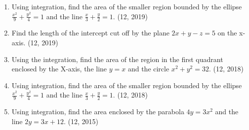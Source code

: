 \begin{enumerate}[label=\thesubsection.\arabic*,ref=\thesubsection.\theenumi]
\item Using integration, find the area of the smaller region bounded by the ellipse $\frac{x^{2}}{9}+\frac{y^{2}}{4}=1$ and the line $\frac{x}{3}+\frac{y}{2}=1$. \hfill (12, 2019)
\item Find the length of the intercept cut off by the plane $2x+y-z=5$ on the x-axis. \hfill (12, 2019)
\item Using the integration, find the area of the region in the first quadrant enclosed by the X-axis, the line $y=x$ and the circle $x^{2}+y^{2}=32$. \hfill (12, 2018)
\item Using integration, find the area of the smaller region bounded by the ellipse $\frac{x^{2}}{9}+\frac{y^{2}}{4}=1$ and the line $\frac{x}{3}+\frac{y}{2}=1$. \hfill (12, 2018)
\item Using integration, find the area enclosed by the parabola $4y = 3x^2$ and the line $2y = 3x+12$. 
\hfill (12, 2015)
\end{enumerate}
